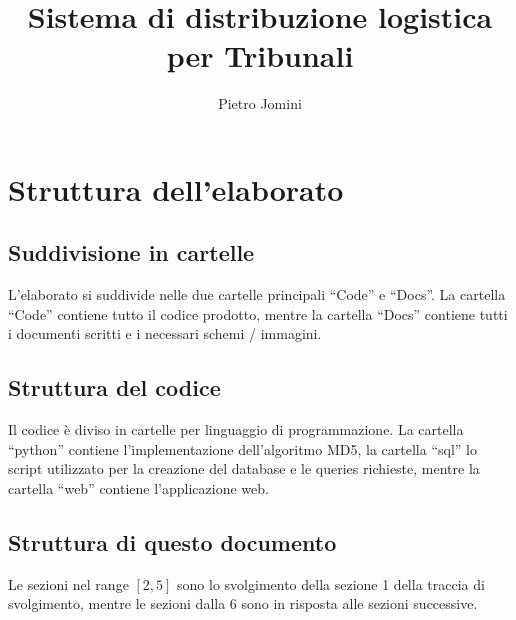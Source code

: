 \documentclass[12pt]{article}
\title{Sistema di distribuzione logistica per Tribunali}
\author{Pietro Jomini}
\date{}
\begin{document}
\maketitle
\newpage
{}

\tableofcontents

\newpage

\section{Struttura dell'elaborato}
\subsection{Suddivisione in cartelle}

L'elaborato si suddivide nelle due cartelle principali ``Code'' e ``Docs''. La cartella ``Code'' contiene tutto il codice prodotto, mentre la cartella ``Docs'' contiene tutti i documenti scritti e i necessari schemi / immagini.

\subsection{Struttura del codice}

Il codice è diviso in cartelle per linguaggio di programmazione. La cartella ``python'' contiene l'implementazione dell'algoritmo MD5, la cartella ``sql'' lo script utilizzato per la creazione del database e le queries richieste, mentre la cartella ``web'' contiene l'applicazione web.

\subsection{Struttura di questo documento}

Le sezioni nel range $[2, 5]$ sono lo svolgimento della sezione 1 della traccia di svolgimento, mentre le sezioni dalla 6 sono in risposta alle sezioni successive.


\newpage

\end{document}
